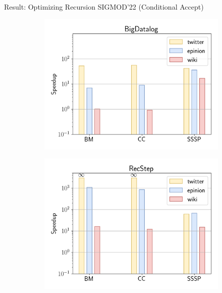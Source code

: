 \documentclass{beamer}
\begin{document}
  \begin{frame}{Result: Optimizing Recursion}
    SIGMOD'22 (Conditional Accept)
    \begin{figure}
      \begin{subfigure}[b]{0.4\textwidth}
        \centering
        \includegraphics[width=\textwidth]{basic-bd}
      \end{subfigure}
      \hfill
      \begin{subfigure}[b]{0.4\textwidth}
        \centering
        \includegraphics[width=\textwidth]{basic-rs}
      \end{subfigure}


\end{figure}
\end{frame}
\end{document}
